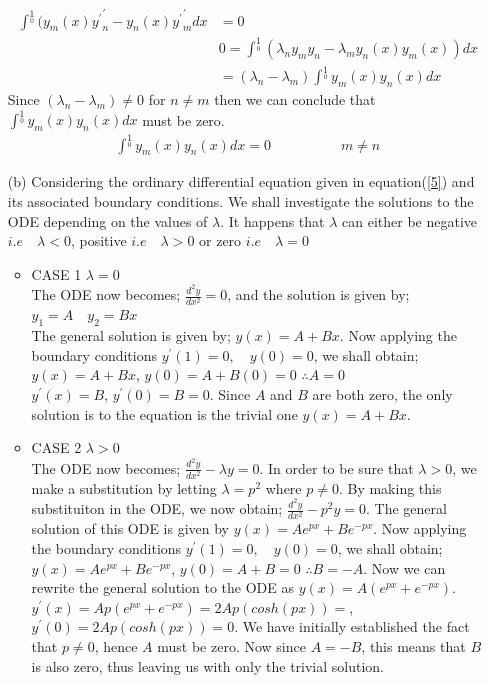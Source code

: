 \documentclass[12pt,a4paper]{article}
\begin{document}
\begin{itemize}
\begin{align}
	\int^{1}\limits_{0}(y_{m}(x){y^{\prime}}^{\prime}_{n}-y_{n}(x){y^{\prime}}^{\prime}_{m}dx&=0\\
	&0=\int^{1}\limits_{0} (\lambda_{n}y_{m}y_{n}-\lambda_{m}y_{n}(x)y_{m}(x))dx\\
	&=(\lambda_{n}-\lambda_{m})\int^{1}\limits_{0}y_{m}(x)y_{n}(x)dx
\end{align}
Since $(\lambda_{n}-\lambda_{m}) \neq 0$ for $n \neq m$ then we can conclude that $\int^{1}\limits_{0}y_{m}(x)y_{n}(x)dx$ must be zero.\\
\begin{align}
\int^{1}\limits_{0}y_{m}(x)y_{n}(x)dx=0   \quad \quad\quad\quad\quad m \neq n \label{10}
\end{align}
\item[(b)]
Considering the ordinary differential equation given in equation(\ref{5}) and its associated boundary conditions. We shall investigate the solutions to the ODE depending on the values of $\lambda $. It happens that $\lambda $ can either be negative $i.e \quad \lambda <0$, positive $i.e \quad \lambda >0$ or zero $i.e \quad \lambda =0$

\begin{itemize}
	\item CASE 1 $\lambda =0$\\
	The ODE now becomes; $\frac{d^{2}y}{dx^{2}}=0$, and the solution is given by;\\
	$y_{1}=A \quad y_{2}=Bx$\\
	The general solution is given by; $y(x)=A+Bx$. Now applying the boundary conditions $y^{\prime}(1)=0 ,\quad  y(0)=0$, we shall obtain;\\
	$y(x)=A+Bx$, $y(0)=A+B(0)=0$ $\therefore A=0$\\
	$y^{\prime}(x)=B$, $y^{\prime}(0)=B=0$.
	Since $A$ and $B$ are both zero, the only solution is to the equation is the trivial one $ y(x)=A+Bx$. 
	
	\item CASE 2 $\lambda >0$\\
	The ODE now becomes; $\frac{d^{2}y}{dx^{2}}-\lambda y=0$. In order to be sure that $\lambda>0$, we make a substitution by letting $\lambda=p^{2}$ where $p \neq 0$. By making this substituiton in the ODE, we now obtain; $\frac{d^{2}y}{dx^{2}}-p^{2}y=0$. The general solution of this ODE is given by $y(x)=Ae^{px}+Be^{-px}$. Now applying the boundary conditions $y^{\prime}(1)=0 ,\quad  y(0)=0$, we shall obtain;\\
	$y(x)=Ae^{px}+Be^{-px}$, $y(0)=A+B=0$ $\therefore B=-A$. Now we can rewrite the general solution to the ODE as $y(x)=A(e^{px}+e^{-px})$.\\
	$y^{\prime}(x)=Ap(e^{px}+e^{-px})=2Ap(cosh(px))=$, $y^{\prime}(0)=2Ap(cosh(px))=0$. We have initially established the fact that $p \neq 0$, hence $A$ must be zero. Now since $A=-B$, this means that $B$ is also zero, thus leaving us with only the trivial solution.
	

\end{itemize}
\end{itemize}
\end{document}

